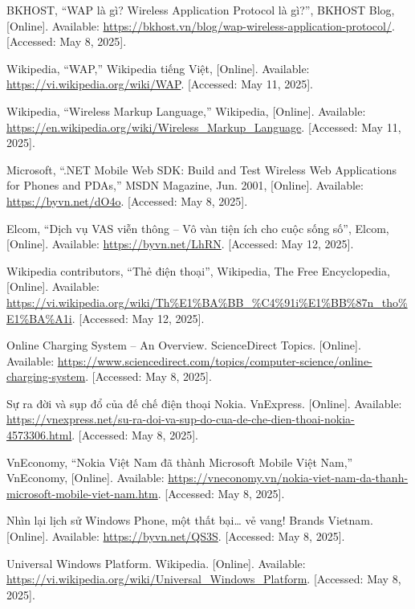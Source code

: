 \documentclass[12pt]{report}
\begin{document}
\begin{thebibliography}{1}
  BKHOST, “WAP là gì? Wireless Application Protocol là gì?”, BKHOST Blog, [Online]. Available: \url{https://bkhost.vn/blog/wap-wireless-application-protocol/}. [Accessed: May 8, 2025].


  Wikipedia, “WAP,” Wikipedia tiếng Việt, [Online]. Available: \url{https://vi.wikipedia.org/wiki/WAP}. [Accessed: May 11, 2025].


  Wikipedia, “Wireless Markup Language,” Wikipedia, [Online]. Available: \url{https://en.wikipedia.org/wiki/Wireless_Markup_Language}. [Accessed: May 11, 2025].

  Microsoft, “.NET Mobile Web SDK: Build and Test Wireless Web Applications for Phones and PDAs,” MSDN Magazine, Jun. 2001, [Online]. Available: \url{https://byvn.net/dO4o}. [Accessed: May 8, 2025].

  Elcom, “Dịch vụ VAS viễn thông – Vô vàn tiện ích cho cuộc sống số”, Elcom, [Online]. Available: \url{https://byvn.net/LhRN}. [Accessed: May 12, 2025].


  Wikipedia contributors, “Thẻ điện thoại”, Wikipedia, The Free Encyclopedia, [Online]. Available: \url{https://vi.wikipedia.org/wiki/Th%E1%BA%BB_%C4%91i%E1%BB%87n_tho%E1%BA%A1i}. [Accessed: May 12, 2025].

  Online Charging System – An Overview. ScienceDirect Topics. [Online]. Available: \url{https://www.sciencedirect.com/topics/computer-science/online-charging-system}. [Accessed: May 8, 2025].


  Sự ra đời và sụp đổ của đế chế điện thoại Nokia. VnExpress. [Online]. Available: \url{https://vnexpress.net/su-ra-doi-va-sup-do-cua-de-che-dien-thoai-nokia-4573306.html}. [Accessed: May 8, 2025].


  VnEconomy, “Nokia Việt Nam đã thành Microsoft Mobile Việt Nam,” VnEconomy, [Online]. Available: \url{https://vneconomy.vn/nokia-viet-nam-da-thanh-microsoft-mobile-viet-nam.htm}. [Accessed: May 8, 2025].

  Nhìn lại lịch sử Windows Phone, một thất bại… vẻ vang! Brands Vietnam. [Online]. Available: \url{https://byvn.net/QS3S}. [Accessed: May 8, 2025].


  Universal Windows Platform. Wikipedia. [Online]. Available: \url{https://vi.wikipedia.org/wiki/Universal_Windows_Platform}. [Accessed: May 8, 2025].



\end{thebibliography}
\end{document}

